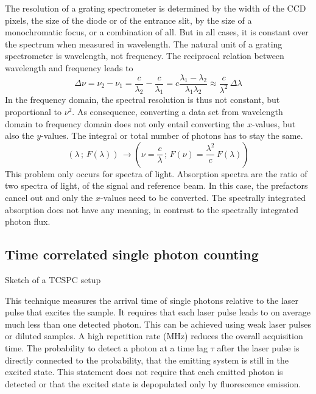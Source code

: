 The resolution of a grating spectrometer is determined by the width of the CCD pixels, the size of the diode or of the entrance slit, by the size of a monochromatic focus, or a combination of all. But in all cases, it is constant over the spectrum when measured in wavelength. The natural unit of a grating spectrometer is wavelength, not frequency. The reciprocal relation between wavelength and frequency leads to 
\begin{equation}
 \Delta \nu = \nu_2 - \nu_1 = \frac{c}{\lambda_2} - \frac{c}{\lambda_1}  = c \frac{\lambda_1 - \lambda_2}{\lambda_1 \lambda_2} \approx \frac{c}{\lambda^2} \, \Delta \lambda
\end{equation}
In the frequency domain, the spectral resolution is thus not constant, but proportional to $\nu^2$. As consequence, converting a data set from wavelength domain to frequency domain does not only entail converting the $x$-values, but also the $y$-values. The integral or total number of photons has to stay the same.
\begin{equation}
 \left( \lambda \, ; \, F(\lambda) \right) \, \rightarrow  \left( \nu = \frac{c}{ \lambda} \, ; \,  F(\nu) = \frac{\lambda^2}{ c } \, F(\lambda) \right) 
\end{equation}
This problem only occurs for spectra of light. Absorption spectra are the ratio of two spectra of light, of the signal and reference beam. In this case, the prefactors cancel out and only the $x$-values need to be converted. The spectrally integrated absorption does not have any meaning, in contrast to the spectrally integrated photon flux.



\subsection{Time correlated single photon counting}

\begin{marginfigure}

  \caption{Sketch of a TCSPC setup}
\end{marginfigure}

This technique measures the arrival time of single photons relative to the laser pulse that excites the sample. It requires that each laser pulse leads to on average much less than one detected photon. This can be achieved using weak laser pulses or diluted samples. A high repetition rate (MHz) reduces the overall acquisition time. The probability to detect a photon at a time lag $\tau$ after the laser pulse is directly connected to the probability, that the emitting system is still in the excited state. This statement does not require that each emitted photon is detected or that the excited state is depopulated only by fluorescence emission.





